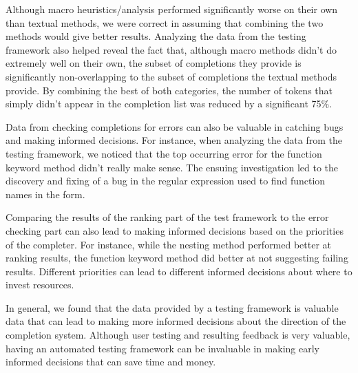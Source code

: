 \documentclass[ms,electronic,twosidetoc,letterpaper,chaptercenter,parttop,lol,lof,lot]{byumsphd}
\begin{document}
Although macro heuristics/analysis performed significantly worse on their own than textual methods, we were correct in assuming that combining the two methods would give better results.
Analyzing the data from the testing framework also helped reveal the fact that, although macro methods didn't do extremely well on their own, the subset of completions they provide is significantly non-overlapping to the subset of completions the textual methods provide.
By combining the best of both categories, the number of tokens that simply didn't appear in the completion list was reduced by a significant 75\%.

Data from checking completions for errors can also be valuable in catching bugs and making informed decisions.
For instance, when analyzing the data from the testing framework, we noticed that the top occurring error for the function keyword method didn't really make sense.
The ensuing investigation led to the discovery and fixing of a bug in the regular expression used to find function names in the  form.

Comparing the results of the ranking part of the test framework to the error checking part can also lead to making informed decisions based on the priorities of the completer.
For instance, while the nesting method performed better at ranking results, the function keyword method did better at not suggesting failing results.
Different priorities can lead to different informed decisions about where to invest resources.

In general, we found that the data provided by a testing framework is valuable data that can lead to making more informed decisions about the direction of the completion system.
Although user testing and resulting feedback is very valuable, having an automated testing framework can be invaluable in making early informed decisions that can save time and money.



\end{document}
